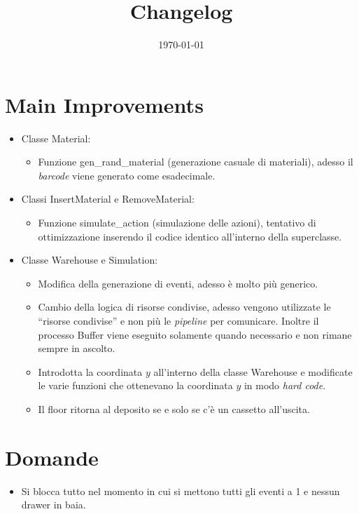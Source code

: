 \documentclass[a4paper]{article}
\newcommand{\dquotes}[1]{``#1''}
\begin{document}
	\title{Changelog}
	\date{\today}
	\maketitle
	
	\newpage
	
	\section*{Main Improvements}
	\begin{itemize}[label=]
		\item Classe \textsf{Material}:
		\begin{itemize}
			\item Funzione \textsf{gen\_rand\_material} (generazione casuale di materiali), adesso il \emph{barcode} viene generato come esadecimale.
		\end{itemize}
	
		\item Classi \textsf{InsertMaterial} e \textsf{RemoveMaterial}:
		\begin{itemize}
			\item Funzione \textsf{simulate\_action} (simulazione delle azioni), tentativo di ottimizzazione inserendo il codice identico all'interno della superclasse.
		\end{itemize}
	
		\item Classe \textsf{Warehouse} e \textsf{Simulation}:
		\begin{itemize}
			\item Modifica della generazione di eventi, adesso è molto più generico.
			\item Cambio della logica di risorse condivise, adesso vengono utilizzate le \dquotes{risorse condivise} e non più le \emph{pipeline} per comunicare. Inoltre il processo \textsf{Buffer} viene eseguito solamente quando necessario e non rimane sempre in ascolto.
			\item Introdotta la coordinata $y$ all'interno della classe \textsf{Warehouse} e modificate le varie funzioni che ottenevano la coordinata $y$ in modo \emph{hard code}.
			\item Il \textsf{floor} ritorna al deposito se e solo se c'è un cassetto all'uscita.
		\end{itemize}
	\end{itemize}
	
	\section*{Domande}
	\begin{itemize}
		\item Si blocca tutto nel momento in cui si mettono tutti gli eventi a 1 e nessun drawer in baia.
	\end{itemize}
\end{document}

